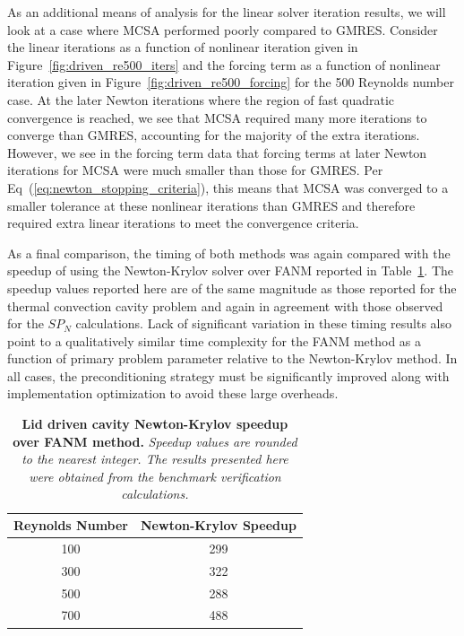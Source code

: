 As an additional means of analysis for the linear solver iteration
results, we will look at a case where MCSA performed poorly compared
to GMRES. Consider the linear iterations as a function of nonlinear
iteration given in Figure~\ref{fig:driven_re500_iters} and the forcing
term as a function of nonlinear iteration given in
Figure~\ref{fig:driven_re500_forcing} for the 500 Reynolds number
case. At the later Newton iterations where the region of fast
quadratic convergence is reached, we see that MCSA required many more
iterations to converge than GMRES, accounting for the majority of the
extra iterations. However, we see in the forcing term data that
forcing terms at later Newton iterations for MCSA were much smaller
than those for GMRES. Per Eq~(\ref{eq:newton_stopping_criteria}), this
means that MCSA was converged to a smaller tolerance at these
nonlinear iterations than GMRES and therefore required extra linear
iterations to meet the convergence criteria.

As a final comparison, the timing of both methods was again compared
with the speedup of using the Newton-Krylov solver over FANM reported
in Table~\ref{tab:driven_speedup_comparison}. The speedup values
reported here are of the same magnitude as those reported for the
thermal convection cavity problem and again in agreement with those
observed for the $SP_N$ calculations. Lack of significant variation in
these timing results also point to a qualitatively similar time
complexity for the FANM method as a function of primary problem
parameter relative to the Newton-Krylov method. In all cases, the
preconditioning strategy must be significantly improved along with
implementation optimization to avoid these large overheads.

\begin{table}[h!]
  \begin{center}
    \begin{tabular}{cc}\hline\hline
      \multicolumn{1}{c}{Reynolds Number}& 
      \multicolumn{1}{c}{Newton-Krylov Speedup}\\
      \hline
      100 & 299 \\
      300 & 322 \\
      500 & 288 \\
      700 & 488 \\
      \hline\hline
    \end{tabular}
  \end{center}
  \caption{\textbf{Lid driven cavity Newton-Krylov speedup over FANM
      method.} \textit{Speedup values are rounded to the nearest
      integer. The results presented here were obtained from the
      benchmark verification calculations.}}
  \label{tab:driven_speedup_comparison}
\end{table}

